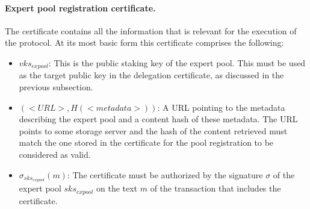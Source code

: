 \paragraph{Expert pool registration certificate.}
The certificate contains all the information that is relevant for the execution
of the protocol. At its most basic form this certificate comprises the
following:
\begin{itemize}
\item $vks_{expool}$: This is the public staking key of the expert pool. This
  must be used as the target public key in the delegation certificate, as
  discussed in the previous subsection.
\item $(<URL>, H(<metadata>))$: A URL pointing to the metadata describing the
  expert pool and a content hash of these metadata. The URL points to some
  storage server and the hash of the content retrieved must match the one stored
  in the certificate for the pool registration to be considered as valid.
\item $\sigma_{sks_{expool}}(m)$: The certificate must be authorized by the
  signature $\sigma$ of the expert pool $sks_{expool}$ on the text $m$ of the
  transaction that includes the certificate.
\end{itemize}

